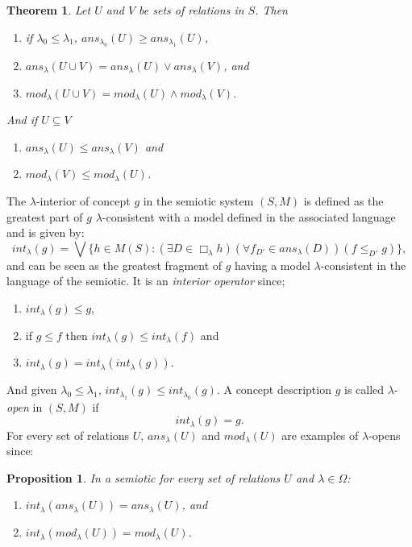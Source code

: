 \documentclass[oribibl]{llncs}
\newtheorem{thm}{Theorem}
\newtheorem{prop}{Proposition}
\begin{document}
\begin{thm}
Let $U$ and $V$ be sets of relations in $S$. Then
\begin{enumerate}
  \item if $\lambda_0\leq\lambda_1$, $ans_{\lambda_0}(U)\geq
  ans_{\lambda_1}(U)$,
  \item $ans_\lambda(U\cup V)=ans_\lambda(U)\vee ans_\lambda(V)$,
  and
  \item $mod_\lambda(U\cup V)=mod_\lambda(U)\wedge mod_\lambda(V)$.
\end{enumerate}
And if $U\subseteq V$
\begin{enumerate}
  \item $ans_\lambda(U)\leq ans_\lambda(V)$ and
  \item $mod_\lambda(V)\leq mod_\lambda(U)$.
\end{enumerate}
\end{thm}

The $\lambda$-interior of concept $g$ in the semiotic system $(S,M)$
is defined as the greatest part of $g$ $\lambda$-consistent with a
model defined in the associated language and is given by:
\[ int_\lambda(g)=\bigvee\{h\in  M(S): (\exists D\in \Box_\lambda h)(\forall f_{D'}\in ans_\lambda(D))
(f\leq_{D'} g)\},\] and can be seen as the greatest fragment of
$g$ having a model $\lambda$-consistent in the language of the
semiotic. It is an \emph{interior operator} since;
\begin{enumerate}
  \item $int_\lambda(g)\leq g$,
  \item if $g\leq f$ then $int_\lambda(g)\leq int_\lambda(f)$ and
  \item $int_\lambda(g)= int_\lambda(int_\lambda(g))$.
\end{enumerate}
And given $\lambda_0\leq\lambda_1$, $int_{\lambda_1}(g)\leq
int_{\lambda_0}(g)$. A concept description $g$ is called
$\lambda$-\emph{open} in $(S,M)$ if
\[int_\lambda(g)= g.\]
For every set of relations $U$, $ans_\lambda(U)$ and
$mod_\lambda(U)$ are examples of $\lambda$-opens since:

\begin{prop}
In a semiotic for every set of relations $U$ and $\lambda\in\Omega$:
\begin{enumerate}
  \item $int_\lambda(ans_\lambda(U))=ans_\lambda(U)$, and
  \item $int_\lambda(mod_\lambda(U))=mod_\lambda(U)$.
\end{enumerate}
\end{prop}
\end{document}
